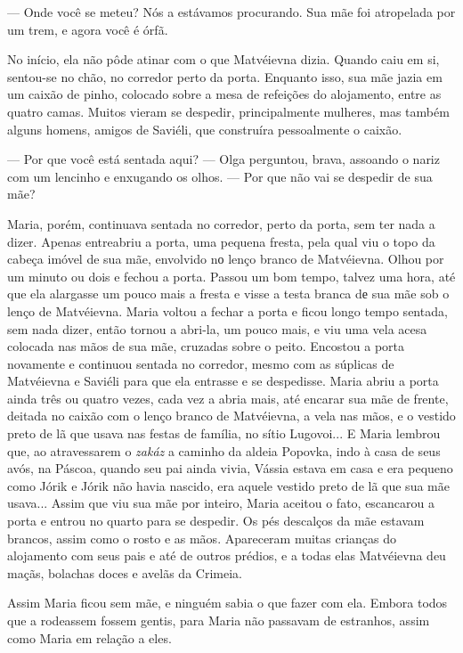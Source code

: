 --- Onde você se meteu? Nós a estávamos procurando. Sua mãe foi
atropelada por um trem, e agora você é órfã.

No início, ela não pôde atinar com o que Matvéievna dizia. Quando caiu
em si, sentou-se no chão, no corredor perto da porta. Enquanto isso, sua
mãe jazia em um caixão de pinho, colocado sobre a mesa de refeições do
alojamento, entre as quatro camas. Muitos vieram se despedir,
principalmente mulheres, mas também alguns homens, amigos de Saviéli,
que construíra pessoalmente o caixão.

--- Por que você está sentada aqui? --- Olga perguntou, brava, assoando
o nariz com um lencinho e enxugando os olhos. --- Por que não vai se
despedir de sua mãe?

Maria, porém, continuava sentada no corredor, perto da porta, sem ter
nada a dizer. Apenas entreabriu a porta, uma pequena fresta, pela qual
viu o topo da cabeça imóvel de sua mãe, envolvido nо lenço branco de
Matvéievna. Olhou por um minuto ou dois e fechou a porta. Passou um bom
tempo, talvez uma hora, até que ela alargasse um pouco mais a fresta e
visse a testa branca dе sua mãe sob o lenço de Matvéievna. Maria voltou
a fechar a porta e ficou longo tempo sentada, sem nada dizer, então
tornou a abri-la, um pouco mais, e viu uma vela acesa colocada nas mãos
de sua mãe, cruzadas sobre o peito. Encostou a porta novamente e
continuou sentada no corredor, mesmo com as súplicas de Matvéievna e
Saviéli para que ela entrasse e se despedisse. Maria abriu a porta ainda
três ou quatro vezes, cada vez a abria mais, até encarar sua mãe de
frente, deitada no caixão com o lenço branco de Matvéievna, a vela nas
mãos, e o vestido preto de lã que usava nas festas de família, no sítio
Lugovoi... E Maria lembrou que, ao atravessarem o \emph{zakáz} a caminho
da aldeia Popovka, indo à casa de seus avós, na Páscoa, quando seu pai
ainda vivia, Vássia estava em casa e era pequeno como Jórik e Jórik não
havia nascido, era aquele vestido preto de lã que sua mãe usava... Assim
que viu sua mãe por inteiro, Maria aceitou o fato, escancarou a porta e
entrou no quarto para se despedir. Os pés descalços da mãe estavam
brancos, assim como o rosto e as mãos. Apareceram muitas crianças do
alojamento com seus pais e até de outros prédios, e a todas elas
Matvéievna deu maçãs, bolachas doces e avelãs da Crimeia.

Assim Maria ficou sem mãe, e ninguém sabia o que fazer com ela. Embora
todos que a rodeassem fossem gentis, para Maria não passavam de
estranhos, assim como Maria em relação a eles.

